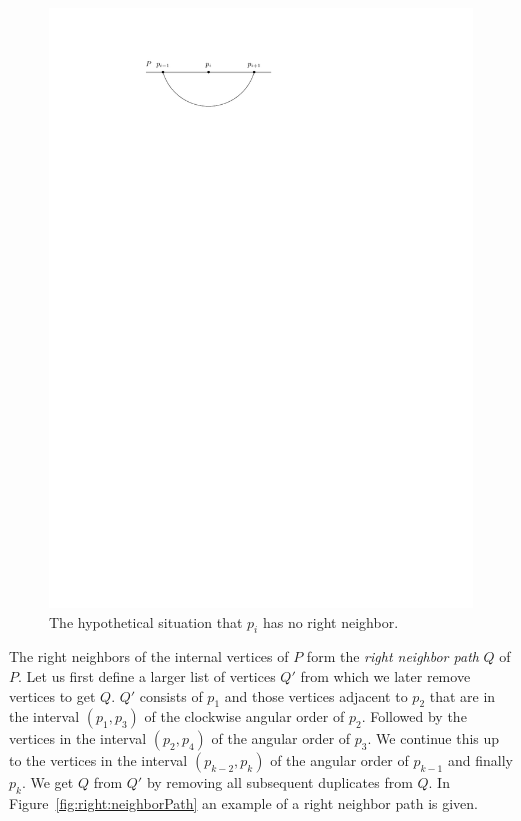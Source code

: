     \begin{figure}[t]
      \centering
      \includegraphics[scale=1]{unifiedAlgo/img/rightNeighbourwalk/pHasRightNeighbor.pdf}
      \caption{The hypothetical situation that $p_i$ has no right neighbor.}
      \label{fig:right:pHasRightNeighbor}
    \end{figure}

    The right neighbors of the internal vertices of $P$ form the \emph{right neighbor path} $Q$ of $P$.
    Let us first define a larger list of vertices $Q'$ from which we later remove vertices to get $Q$. $Q'$ consists of $p_1$ and those vertices adjacent to $p_{2}$ that are in the interval $(p_1, p_3)$ of the clockwise angular order of $p_2$. Followed by the vertices in the interval $(p_2, p_4)$ of the angular order of $p_{3}$. We continue this up to the vertices in the interval $(p_{k-2}, p_k)$ of the angular order of $p_{k-1}$ and finally $p_k$.
    We get $Q$ from $Q'$ by removing all subsequent duplicates from $Q$.
    In Figure~\ref{fig:right:neighborPath} an example of a right neighbor path is given.

